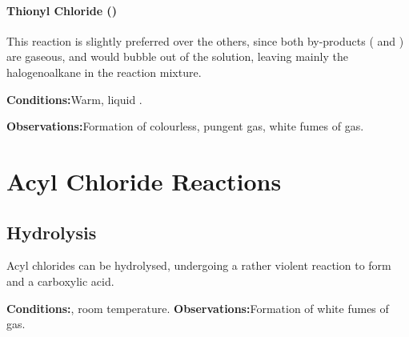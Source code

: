		\paragraph{Thionyl Chloride ()}

		This reaction is slightly preferred over the others, since both by-products ( and ) are
		gaseous, and would bubble out of the solution, leaving mainly the halogenoalkane in the reaction mixture.

		\vspace{1.5em}
		\vbox{\textbf{Conditions:}\tabto{35mm}Warm, liquid .}

		\vspace{0.75em}
		\vbox{\textbf{Observations:}\tabto{35mm}Formation of colourless, pungent  gas,
									\tabto{35mm}white fumes of  gas.}





	\section{Acyl Chloride Reactions}

		\subsection{Hydrolysis}

			Acyl chlorides can be hydrolysed, undergoing a rather violent reaction to form  and a carboxylic acid.

			\vspace{1.5em}
			\vbox{\textbf{Conditions:}\tabto{35mm}, room temperature.}
			\vbox{\textbf{Observations:}\tabto{35mm}Formation of white fumes of  gas.}


